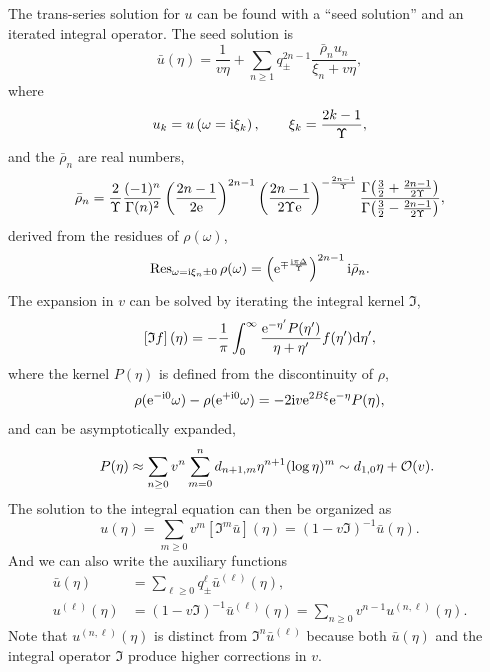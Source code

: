 \documentclass[a4paper,11pt]{article}
\theoremstyle{definition}
\newcommand{\CO}{{\cal O}}
\newcommand{\re}{{\rm e}}
\newcommand{\ri}{{\rm i}}
\newcommand{\rd}{{\rm d}}
\newcommand{\be}{\begin{equation}}
\newcommand{\ee}{\end{equation}}
\newcommand{\ba}{\begin{aligned}}
\newcommand{\ea}{\end{aligned}}
\begin{document}
The trans-series solution for $u$ can be found with a ``seed solution'' and an iterated integral operator. The seed solution is
\be
\bar{u}(\eta) = \frac{1}{v\eta} +  \sum_{n\geq 1}
q^{2n-1}_\pm
\frac{\bar{\rho}_n u_n}{\xi_n+v\eta},
\label{seed-solution}
\ee
where
\begin{equation}
u_k = u\left(\omega = \ri \xi_k\right),\qquad \xi_k = \frac{2k-1}{\Upsilon},
\end{equation}
and the $\bar\rho_n$ are real numbers,
\begin{equation}
\bar\rho_n=\frac{2}{\Upsilon} \frac{(-1)^{n}}{\Gamma(n)^2} \left(\frac{2n-1}{2\re}\right)^{2n-1} \left( \frac{2n-1}{2\Upsilon\re} \right)^{-\frac{2n-1}{\Upsilon}} \frac{\Gamma\big(\frac{3}{2} + \frac{2n-1}{2\Upsilon}\big)}{\Gamma\big(\frac{3}{2} - \frac{2n-1}{2\Upsilon}\big)},
\label{polepm}
\end{equation}
derived from the residues of $\rho(\omega)$,
\begin{equation}
\text{Res}_{\omega=\ri\xi_n\pm 0}\, \rho(\omega) = \left(\re^{\mp\frac{\ri\pi\Delta}{\Upsilon}}\right)^{2n-1}\ri \bar\rho_n.
\label{rho_factor}
\end{equation}
The expansion in $v$ can be solved by iterating the integral kernel $\mathfrak{I}$,
\begin{equation}
\left[\mathfrak{I} f\right](\eta) = - \frac{1}{\pi}\int_0^\infty \frac{\re^{-\eta'}P(\eta')}{\eta+\eta'} f(\eta')\rd\eta',
\end{equation}
where the kernel $P(\eta)$ is defined from the discontinuity of $\rho$, 
\begin{equation}
\rho(\re^{-\ri 0}\omega)-\rho(\re^{+\ri 0}\omega) = -2\ri v \re^{2B\xi} \re^{-\eta}P(\eta),
\label{P-def}
\end{equation}
and can be asymptotically expanded,
\begin{equation}
 \quad P(\eta) \approx \sum_{n\geq 0} v^n \sum_{m=0}^n d_{n+1,m} \eta^{n+1} (\log\eta)^m\sim d_{1,0}\eta + \CO(v).
 \label{P-expansion}
\end{equation}
The solution to the integral equation can then be organized as
\begin{equation}
u(\eta)= \sum_{m\geq 0} v^m [\mathfrak{I}^m\bar{u}](\eta) = (1-v\mathfrak{I})^{-1}\bar{u}(\eta)  .
\end{equation}
And we can also write the auxiliary functions
\begin{equation}
\ba
\bar{u}(\eta) &= \sum_{\ell\geq 0} q_\pm^\ell \bar{u}^{(\ell)}(\eta),\\
u^{(\ell)}(\eta) &= (1-v\mathfrak{I})^{-1}\bar{u}^{(\ell)}(\eta) = \sum_{n\geq 0} v^{n-1} u^{(n,\ell)}(\eta).
\ea
\label{ueta}
\end{equation}
Note that $u^{(n,\ell)}(\eta)$ is distinct from $\mathfrak{I}^n\bar{u}^{(\ell)}$ because both $\bar{u}(\eta)$ and the integral operator $\mathfrak{I}$ produce higher corrections in $v$.
\end{document}
